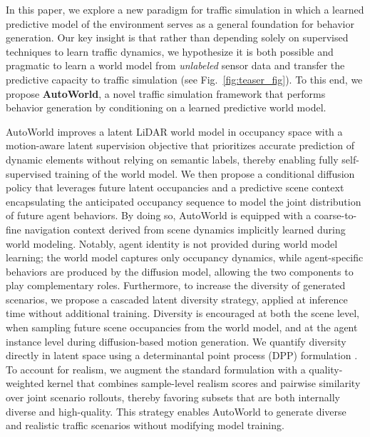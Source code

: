 \documentclass[runningheads]{llncs}
\begin{document}
In this paper, we explore a new paradigm for traffic simulation in which a learned predictive model of the environment serves as a general foundation for behavior generation. Our key insight is that rather than depending solely on supervised techniques to learn traffic dynamics, we hypothesize it is both possible and pragmatic to learn a world model from \textit{unlabeled} sensor data and transfer the predictive capacity to traffic simulation (see Fig.~\ref{fig:teaser_fig}). To this end, we propose \textbf{AutoWorld}, a novel traffic simulation framework that performs behavior generation by conditioning on a learned predictive world model.

AutoWorld improves a latent LiDAR world model in occupancy space with a motion-aware latent supervision objective that prioritizes accurate prediction of dynamic elements without relying on semantic labels, thereby enabling fully self-supervised training of the world model. We then propose a conditional diffusion policy that leverages future latent occupancies and a predictive scene context encapsulating the anticipated occupancy sequence to model the joint distribution of future agent behaviors. By doing so, AutoWorld is equipped with a coarse-to-fine navigation context derived from scene dynamics implicitly learned during world modeling. Notably, agent identity is not provided during world model learning; the world model captures only occupancy dynamics, while agent-specific behaviors are produced by the diffusion model, allowing the two components to play complementary roles. Furthermore, to increase the diversity of generated scenarios, we propose a cascaded latent diversity strategy, applied at inference time without additional training. Diversity is encouraged at both the scene level, when sampling future scene occupancies from the world model, and at the agent instance level during diffusion-based motion generation. We quantify diversity directly in latent space using a determinantal point process (DPP) formulation \cite{kulesza2012determinantal}. To account for realism, we augment the standard formulation with a quality-weighted kernel that combines sample-level realism scores and pairwise similarity over joint scenario rollouts, thereby favoring subsets that are both internally diverse and high-quality. This strategy enables AutoWorld to generate diverse and realistic traffic scenarios without modifying model training.
\end{document}
